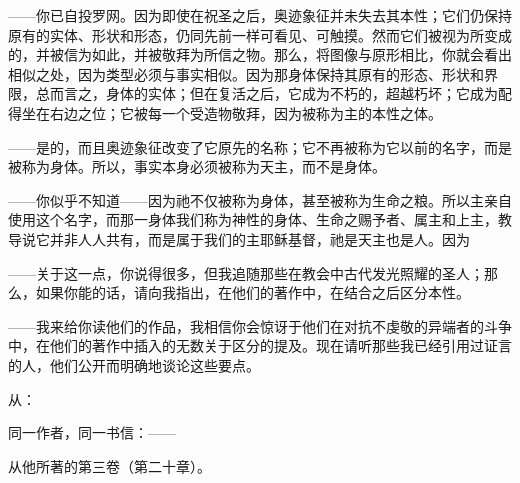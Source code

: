 ——你已自投罗网。因为即使在祝圣之后，奥迹象征并未失去其本性；它们仍保持原有的实体、形状和形态，仍同先前一样可看见、可触摸。然而它们被视为所变成的，并被信为如此，并被敬拜为所信之物。那么，将图像与原形相比，你就会看出相似之处，因为类型必须与事实相似。因为那身体保持其原有的形态、形状和界限，总而言之，身体的实体；但在复活之后，它成为不朽的，超越朽坏；它成为配得坐在右边之位；它被每一个受造物敬拜，因为被称为主的本性之体。\par

——是的，而且奥迹象征改变了它原先的名称；它不再被称为它以前的名字，而是被称为身体。所以，事实本身必须被称为天主，而不是身体。\par

——你似乎不知道——因为祂不仅被称为身体，甚至被称为生命之粮。所以主亲自使用这个名字，而那一身体我们称为神性的身体、生命之赐予者、属主和上主，教导说它并非人人共有，而是属于我们的主耶稣基督，祂是天主也是人。因为\par

——关于这一点，你说得很多，但我追随那些在教会中古代发光照耀的圣人；那么，如果你能的话，请向我指出，在他们的著作中，在结合之后区分本性。\par

——我来给你读他们的作品，我相信你会惊讶于他们在对抗不虔敬的异端者的斗争中，在他们的著作中插入的无数关于区分的提及。现在请听那些我已经引用过证言的人，他们公开而明确地谈论这些要点。\par

\par

从：\par

同一作者，同一书信：——\par

\par

\par

从他所著的第三卷（第二十章）。\par

\par

